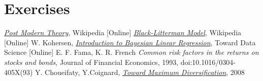 \section{Exercises}


\begin{thebibliography}{9}
\href{https://en.wikipedia.org/wiki/Post-modern_portfolio_theory}{\emph{Post Modern Theory}}, Wikipedia [Online]
\href{https://en.wikipedia.org/wiki/Black\%E2\%80\%93Litterman_model}{\emph{Black-Litterman Model}}, Wikipedia [Online]
W. Kohersen, \href{https://towardsdatascience.com/introduction-to-bayesian-linear-regression-e66e60791ea7}{\emph{Introduction to Bayesian Linear Regression}}, Toward Data Science [Online]
 E. F. Fama, K. R. French \emph{Common risk factors in the returns on stocks and bonds}, Journal of Financial Economics, 1993, doi:10.1016/0304-405X(93)
 Y. Choueifaty, Y.Coignard, \href{ https://www.tobam.fr/wp-content/uploads/2014/12/TOBAM-JoPM-Maximum-Div-2008.pdf}{\emph{Toward Maximum Diversification}}, 2008
\end{thebibliography}